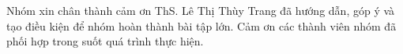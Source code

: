 
Nhóm xin chân thành cảm ơn ThS. Lê Thị Thùy Trang đã hướng dẫn, góp ý và tạo điều kiện để nhóm hoàn thành bài tập lớn.
Cảm ơn các thành viên nhóm đã phối hợp trong suốt quá trình thực hiện.
